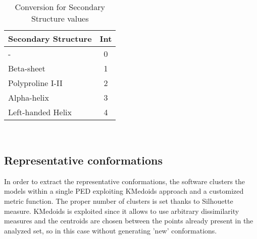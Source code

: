\begin{table}[H]
\begin{center}
\begin{tabular}{lc}
\textbf{Secondary Structure} & \textbf{Int}\\
\hline
- & 0\\
\hline
Beta-sheet & 1\\
\hline
Polyproline I-II & 2\\
\hline
Alpha-helix & 3\\
\hline
Left-handed Helix & 4\\
\end{tabular}
\end{center}
\caption{Conversion for Secondary Structure values}~\label{tab:ss}
\end{table}


\subsection{Representative conformations} 
In order to extract the representative conformations, the software clusters the models within a single PED exploiting KMedoids approach and a customized metric function. The proper number of clusters is set thanks to Silhouette measure. 
KMedoids is exploited since it allows to use arbitrary dissimilarity measures and the centroids are chosen between the points already present in the analyzed set, so in this case without generating 'new' conformations. 

